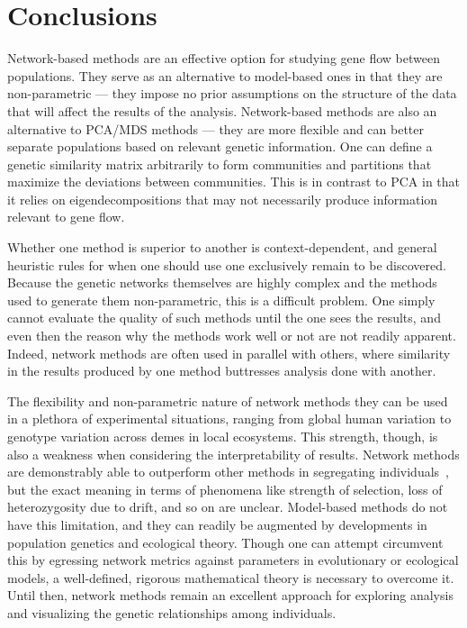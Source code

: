 \documentclass{essay}
\begin{document}
\section{Conclusions}

Network-based methods are an effective option for studying gene flow between
populations. They serve as an alternative to model-based ones in that they are
non-parametric --- they impose no prior assumptions on the structure of the
data that will affect the results of the analysis. Network-based methods are
also an alternative to PCA/MDS methods --- they are more flexible and can
better separate populations based on relevant genetic information. One can
define a genetic similarity matrix arbitrarily to form communities and
partitions that maximize the deviations between communities. This is in
contrast to PCA in that it relies on eigendecompositions that may not
necessarily produce information relevant to gene flow.

Whether one method is superior to another is context-dependent, and general
heuristic rules for when one should use one exclusively remain to be
discovered. Because the genetic networks themselves are highly complex and the
methods used to generate them non-parametric, this is a difficult problem. One
simply cannot evaluate the quality of such methods until the one sees the
results, and even then the reason why the methods work well or not are not
readily apparent. Indeed, network methods are often used in parallel with
others, where similarity in the results produced by one method buttresses
analysis done with another.

The flexibility and non-parametric nature of network methods they can be used
in a plethora of experimental situations, ranging from global human variation
to genotype variation across demes in local ecosystems. This strength, though,
is also a weakness when considering the interpretability of results. Network
methods are demonstrably able to outperform other methods in segregating
individuals~\cite{greenbaum_inference_2016,neuditschko_netview:_2012,dyer_population_2004},
but the exact meaning in terms of phenomena like strength of selection, loss of
heterozygosity due to drift, and so on are unclear. Model-based methods do not
have this limitation, and they can readily be augmented by developments in
population genetics and ecological theory. Though one can attempt circumvent
this by egressing network metrics against parameters in evolutionary or
ecological models, a well-defined, rigorous mathematical theory is necessary to
overcome it. Until then, network methods remain an excellent approach for
exploring analysis and visualizing the genetic relationships among individuals.

\newpage


\end{document}

